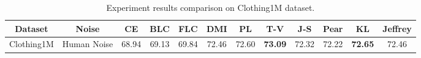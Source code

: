\begin{table*}[!ht]
\scriptsize
\centering
\begin{threeparttable}
\begin{tabular}{c|c|c|c|c|c|c|c|c|c|c|c}
\hline
Dataset & Noise & CE & BLC & FLC & DMI& PL & T-V & J-S & Pear  & KL & Jeffrey \\ \hline\hline
\multirow{1}{*}{Clothing1M}
& Human Noise & 68.94 & 69.13 & 69.84 & 72.46  & 72.60  & {\color{blue}\textbf{73.09}} & 72.32 &  72.22 & {\color{blue}\textbf{72.65}}  & 72.46
\\ \cline{2-12}
\hline
\end{tabular}
\end{threeparttable}
\caption{Experiment results comparison on Clothing1M dataset.
}
\label{Tab:Experiment_Results_C1M}
\end{table*}

